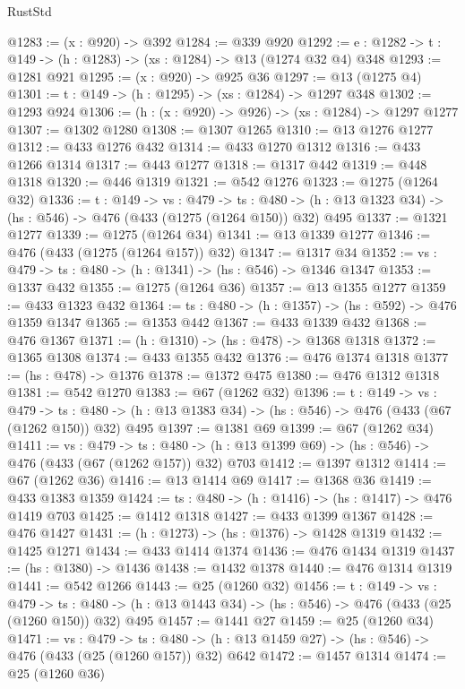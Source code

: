\begin{lexlean}{RustStd}
\begin{coremodule}
@1283 := (x : @920) -> @392
@1284 := @339 @920
@1292 := {e : @1282} -> {t : @149} -> (h : @1283) -> (xs : @1284) -> @13 (@1274 @32 @4) @348
@1293 := @1281 @921
@1295 := (x : @920) -> @925 @36
@1297 := @13 (@1275 @4)
@1301 := {t : @149} -> (h : @1295) -> (xs : @1284) -> @1297 @348
@1302 := @1293 @924
@1306 := (h : (x : @920) -> @926) -> (xs : @1284) -> @1297 @1277
@1307 := @1302 @1280
@1308 := @1307 @1265
@1310 := @13 @1276 @1277
@1312 := @433 @1276 @432
@1314 := @433 @1270 @1312
@1316 := @433 @1266 @1314
@1317 := @443 @1277
@1318 := @1317 @442
@1319 := @448 @1318
@1320 := @446 @1319
@1321 := @542 @1276
@1323 := @1275 (@1264 @32)
@1336 := {t : @149} ->
  {vs : @479} ->
  {ts : @480} -> (h : @13 @1323 @34) -> (hs : @546) -> @476 (@433 (@1275 (@1264 @150)) @32) @495
@1337 := @1321 @1277
@1339 := @1275 (@1264 @34)
@1341 := @13 @1339 @1277
@1346 := @476 (@433 (@1275 (@1264 @157)) @32)
@1347 := @1317 @34
@1352 := {vs : @479} -> {ts : @480} -> (h : @1341) -> (hs : @546) -> @1346 @1347
@1353 := @1337 @432
@1355 := @1275 (@1264 @36)
@1357 := @13 @1355 @1277
@1359 := @433 @1323 @432
@1364 := {ts : @480} -> (h : @1357) -> (hs : @592) -> @476 @1359 @1347
@1365 := @1353 @442
@1367 := @433 @1339 @432
@1368 := @476 @1367
@1371 := (h : @1310) -> (hs : @478) -> @1368 @1318
@1372 := @1365 @1308
@1374 := @433 @1355 @432
@1376 := @476 @1374 @1318
@1377 := (hs : @478) -> @1376
@1378 := @1372 @475
@1380 := @476 @1312 @1318
@1381 := @542 @1270
@1383 := @67 (@1262 @32)
@1396 := {t : @149} ->
  {vs : @479} ->
  {ts : @480} -> (h : @13 @1383 @34) -> (hs : @546) -> @476 (@433 (@67 (@1262 @150)) @32) @495
@1397 := @1381 @69
@1399 := @67 (@1262 @34)
@1411 := {vs : @479} ->
  {ts : @480} -> (h : @13 @1399 @69) -> (hs : @546) -> @476 (@433 (@67 (@1262 @157)) @32) @703
@1412 := @1397 @1312
@1414 := @67 (@1262 @36)
@1416 := @13 @1414 @69
@1417 := @1368 @36
@1419 := @433 @1383 @1359
@1424 := {ts : @480} -> (h : @1416) -> (hs : @1417) -> @476 @1419 @703
@1425 := @1412 @1318
@1427 := @433 @1399 @1367
@1428 := @476 @1427
@1431 := (h : @1273) -> (hs : @1376) -> @1428 @1319
@1432 := @1425 @1271
@1434 := @433 @1414 @1374
@1436 := @476 @1434 @1319
@1437 := (hs : @1380) -> @1436
@1438 := @1432 @1378
@1440 := @476 @1314 @1319
@1441 := @542 @1266
@1443 := @25 (@1260 @32)
@1456 := {t : @149} ->
  {vs : @479} ->
  {ts : @480} -> (h : @13 @1443 @34) -> (hs : @546) -> @476 (@433 (@25 (@1260 @150)) @32) @495
@1457 := @1441 @27
@1459 := @25 (@1260 @34)
@1471 := {vs : @479} ->
  {ts : @480} -> (h : @13 @1459 @27) -> (hs : @546) -> @476 (@433 (@25 (@1260 @157)) @32) @642
@1472 := @1457 @1314
@1474 := @25 (@1260 @36)

\end{coremodule}
\end{lexlean}
